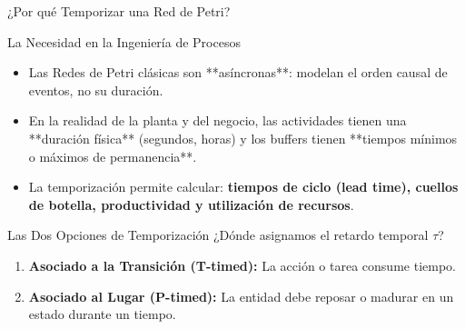 \documentclass[10pt, aspectratio=169]{beamer}
\begin{document}
\begin{frame}{¿Por qué Temporizar una Red de Petri?}
	\begin{block}{La Necesidad en la Ingeniería de Procesos}
		\begin{itemize}
			\item Las Redes de Petri clásicas son **asíncronas**: modelan el orden causal de eventos, no su duración.
			\item En la realidad de la planta y del negocio, las actividades tienen una **duración física** (segundos, horas) y los buffers tienen **tiempos mínimos o máximos de permanencia**.
			\item La temporización permite calcular: \textbf{tiempos de ciclo (lead time), cuellos de botella, productividad y utilización de recursos}.
		\end{itemize}
	\end{block}

	\begin{alertblock}{Las Dos Opciones de Temporización}
		¿Dónde asignamos el retardo temporal $\tau$?
		\begin{enumerate}
			\item \textbf{Asociado a la Transición (T-timed):} La acción o tarea consume tiempo.
			\item \textbf{Asociado al Lugar (P-timed):} La entidad debe reposar o madurar en un estado durante un tiempo.
		\end{enumerate}
	\end{alertblock}
\end{frame}
\end{document}

